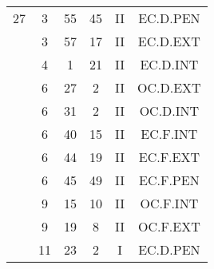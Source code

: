 \documentclass[12pt, a4paper]{article}
\begin{document}
\begin{multicols}{3}
{\begin{tabular}{c c c c c c}
	 	 	 	27 & 3 & 55 & 45 & II & EC.D.PEN\\%
	 	 	 	 & 3 & 57 & 17 & II & EC.D.EXT\\%
	 	 	 	 & 4 & 1 & 21 & II & EC.D.INT\\%
	 	 	 	 & 6 & 27 & 2 & II & OC.D.EXT\\%
	 	 	 	 & 6 & 31 & 2 & II & OC.D.INT\\%
	 	 	 	 & 6 & 40 & 15 & II & EC.F.INT\\%
	 	 	 	 & 6 & 44 & 19 & II & EC.F.EXT\\%
	 	 	 	 & 6 & 45 & 49 & II & EC.F.PEN\\%
	 	 	 	 & 9 & 15 & 10 & II & OC.F.INT\\%
	 	 	 	 & 9 & 19 & 8 & II & OC.F.EXT\\%
	 	 	 	 & 11 & 23 & 2 & I & EC.D.PEN\\%
	 	 \end{tabular}
 	}
\end{multicols}
\end{document}
